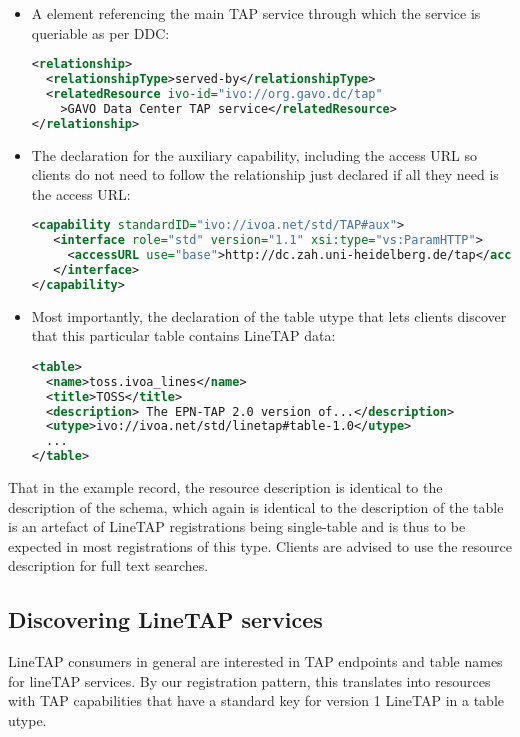 \documentclass[11pt,a4paper]{ivoa}
\begin{document}
\begin{itemize}
\item A  element referencing the main TAP service
through which the service is queriable as per DDC:
\begin{lstlisting}[language=XML,basicstyle=\footnotesize]
<relationship>
  <relationshipType>served-by</relationshipType>
  <relatedResource ivo-id="ivo://org.gavo.dc/tap"
    >GAVO Data Center TAP service</relatedResource>
</relationship>
\end{lstlisting}

\item The declaration for the auxiliary capability, including the access
URL so clients do not need to follow the relationship just declared if
all they need is the access URL:
\begin{lstlisting}[language=XML,basicstyle=\footnotesize]
<capability standardID="ivo://ivoa.net/std/TAP#aux">
   <interface role="std" version="1.1" xsi:type="vs:ParamHTTP">
     <accessURL use="base">http://dc.zah.uni-heidelberg.de/tap</accessURL>
   </interface>
</capability>
\end{lstlisting}

\item Most importantly, the declaration of the table utype that lets
clients discover that this particular table contains LineTAP data:
\begin{lstlisting}[language=XML,basicstyle=\footnotesize]
<table>
  <name>toss.ivoa_lines</name>
  <title>TOSS</title>
  <description> The EPN-TAP 2.0 version of...</description>
  <utype>ivo://ivoa.net/std/linetap#table-1.0</utype>
  ...
</table>
\end{lstlisting}
\end{itemize}

That in the example record, the resource description is identical to the
description of the schema, which again is identical to the description
of the table is an artefact of LineTAP registrations being single-table
and is thus to be expected in most registrations of this type.  Clients
are advised to use the resource description for full text searches.


\subsection{Discovering LineTAP services}

LineTAP consumers in general are interested in TAP endpoints and table names for
lineTAP services.  By our registration pattern, this translates into
resources with TAP capabilities that have a standard key for version 1
LineTAP in a table utype.
\end{document}
